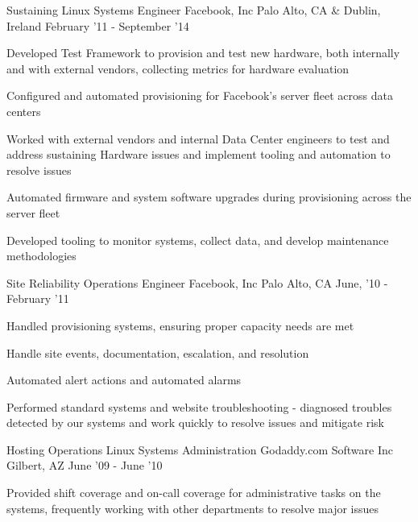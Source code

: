\begin{cventries}
{    }
\vspace{4mm}
\cventry
    {Sustaining Linux Systems Engineer} %
    {Facebook, Inc} %
	{Palo Alto, CA \& Dublin, Ireland} %
    {February '11 - September '14} %
    {
        \begin{cvitems}
          \item Developed Test Framework to provision and test new hardware, both internally and with external vendors, collecting metrics for hardware evaluation
          \item Configured and automated provisioning for Facebook’s server fleet across data centers
          \item Worked with external vendors and internal Data Center engineers to test and address sustaining Hardware issues and implement tooling and automation to resolve issues
		  \item Automated firmware and system software upgrades during provisioning across the server fleet
		  \item Developed tooling to monitor systems, collect data, and develop maintenance methodologies
        \end{cvitems}
    }
\vspace{4mm}
\cventry
    {Site Reliability Operations Engineer} %
    {Facebook, Inc} %
    {Palo Alto, CA} %
    {June, '10 - February '11} %
    {
        \begin{cvitems}
          \item Handled provisioning systems, ensuring proper capacity needs are met
          \item Handle site events, documentation, escalation, and resolution 
          \item Automated alert actions and automated alarms
          \item Performed standard systems and website troubleshooting - diagnosed troubles detected by our systems and work quickly to resolve issues and mitigate risk
        \end{cvitems}
    }
\vspace{4mm}
\cventry
    {Hosting Operations Linux Systems Administration} %
    {Godaddy.com Software Inc} %
    {Gilbert, AZ} %
    {June '09 - June '10} %
    {
        \begin{cvitems}
          \item Provided shift coverage and on-call coverage for administrative tasks on the systems, frequently working with other departments to resolve major issues

\end{cvitems}}
\end{cventries}
